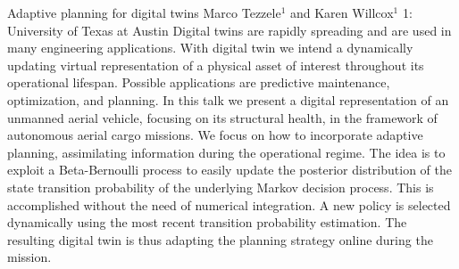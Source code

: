 \vspace{1.5ex}
\abs
{Adaptive planning for digital twins}
{Marco Tezzele$^{1}$ and Karen Willcox$^{1}$}
{1: University of Texas at Austin}
{Digital twins are rapidly spreading and are used in many engineering applications. With digital twin we intend a dynamically updating virtual representation of a physical asset of interest throughout its operational lifespan. Possible applications are predictive maintenance, optimization, and planning. In this talk we present a digital representation of an unmanned aerial vehicle, focusing on its structural health, in the framework of autonomous aerial cargo missions. We focus on how to incorporate adaptive planning, assimilating information during the operational regime. The idea is to exploit a Beta-Bernoulli process to easily update the posterior distribution of the state transition probability of the underlying Markov decision process. This is accomplished without the need of numerical integration. A new policy is selected dynamically using the most recent transition probability estimation. The resulting digital twin is thus adapting the planning strategy online during the mission.}



